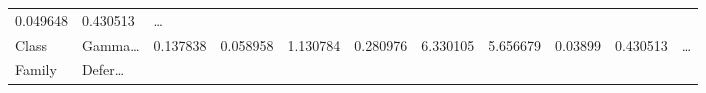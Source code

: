 \documentclass[
]{article}
\begin{document}
\begin{longtable}[]{@{}lllllllllll@{}}
\begin{minipage}[t]{0.06\columnwidth}
0.049648\strut
\end{minipage} & \begin{minipage}[t]{0.06\columnwidth}\raggedright
0.430513\strut
\end{minipage} & \begin{minipage}[t]{0.03\columnwidth}\raggedright
\ldots{}\strut
\end{minipage}\tabularnewline
\begin{minipage}[t]{0.06\columnwidth}\raggedright
Class\strut
\end{minipage} & \begin{minipage}[t]{0.06\columnwidth}\raggedright
Gamma\ldots{}\strut
\end{minipage} & \begin{minipage}[t]{0.09\columnwidth}\raggedright
0.137838\strut
\end{minipage} & \begin{minipage}[t]{0.06\columnwidth}\raggedright
0.058958\strut
\end{minipage} & \begin{minipage}[t]{0.09\columnwidth}\raggedright
1.130784\strut
\end{minipage} & \begin{minipage}[t]{0.06\columnwidth}\raggedright
0.280976\strut
\end{minipage} & \begin{minipage}[t]{0.09\columnwidth}\raggedright
6.330105\strut
\end{minipage} & \begin{minipage}[t]{0.06\columnwidth}\raggedright
5.656679\strut
\end{minipage} & \begin{minipage}[t]{0.06\columnwidth}\raggedright
0.03899\strut
\end{minipage} & \begin{minipage}[t]{0.06\columnwidth}\raggedright
0.430513\strut
\end{minipage} & \begin{minipage}[t]{0.03\columnwidth}\raggedright
\ldots{}\strut
\end{minipage}\tabularnewline
\begin{minipage}[t]{0.06\columnwidth}\raggedright
Family\strut
\end{minipage} & \begin{minipage}[t]{0.06\columnwidth}\raggedright
Defer\ldots{}\strut
\end{minipage} & \begin{minipage}[t]{0.09\columnwidth}\raggedright

\end{minipage}
\end{longtable}
\end{document}
